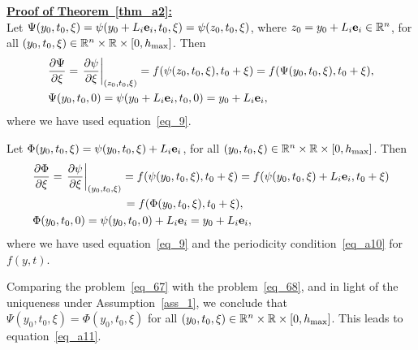 \vspace{8pt}
\noindent\underline{\bf Proof of Theorem~\ref{thm_a2}:}\\
Let $\Psi(y_0,t_0,\xi)=\psi(y_0+L_i\mathbf{e}_i,t_0,\xi)=\psi(z_0,t_0,\xi)$,
where $z_0=y_0+L_i\mathbf{e}_i\in\mathbb{R}^n$, for
all $(y_0,t_0,\xi)\in\mathbb{R}^n\times\mathbb{R}\times[0,h_{\max}]$.
Then
\begin{subequations}\label{eq_67}
  \begin{align}
    &
    \frac{\partial\Psi}{\partial\xi}
    = \left.\frac{\partial\psi}{\partial\xi}\right|_{(z_0,t_0,\xi)}
    = f(\psi(z_0,t_0,\xi),t_0+\xi)
    = f(\Psi(y_0,t_0,\xi),t_0+\xi), \\
    &
    \Psi(y_0,t_0,0) = \psi(y_0+L_i\mathbf{e}_i,t_0,0) = y_0+L_i\mathbf{e}_i,
  \end{align}
\end{subequations}
where we have used equation~\eqref{eq_9}.

Let $\Phi(y_0,t_0,\xi) = \psi(y_0,t_0,\xi) + L_i\mathbf{e}_i$,
for all $(y_0,t_0,\xi)\in\mathbb{R}^n\times\mathbb{R}\times[0,h_{\max}]$.
Then
\begin{subequations}\label{eq_68}
  \begin{align}
    &
    \frac{\partial\Phi}{\partial\xi}
    = \left.\frac{\partial\psi}{\partial\xi}\right|_{(y_0,t_0,\xi)}
    = f(\psi(y_0,t_0,\xi),t_0+\xi)
    = f(\psi(y_0,t_0,\xi)+L_i\mathbf{e}_i,t_0+\xi) \notag \\
    &\qquad\qquad\qquad\qquad
    = f(\Phi(y_0,t_0,\xi),t_0+\xi), \\
    &
    \Phi(y_0,t_0,0) = \psi(y_0,t_0,0)+L_i\mathbf{e}_i = y_0+L_i\mathbf{e}_i,
  \end{align}
\end{subequations}
where we have used equation~\eqref{eq_9} and
the periodicity condition~\eqref{eq_a10} for $f(y,t)$.

Comparing the problem~\eqref{eq_67} with the problem~\eqref{eq_68},
and in light of the uniqueness under Assumption~\ref{ass_1},
we conclude that $\Psi(y_0,t_0,\xi)=\Phi(y_0,t_0,\xi)$
for all $(y_0,t_0,\xi)\in\mathbb{R}^n\times\mathbb{R}\times[0,h_{\max}]$.
This leads to equation~\eqref{eq_a11}.
